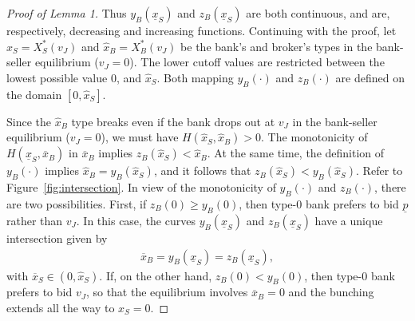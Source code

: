 \documentclass[11pt,twopage]{article}
\newcommand{\ol}{\overline}
\newcommand{\ul}{\underline}
\begin{document}
\begin{proof}[Proof of Lemma 1]
Thus $y_B(\ul x_S)$ and $z_B(\ul x_S)$ are both continuous, and are,
respectively, decreasing and increasing functions. Continuing with the
proof, let $\hat x_S = X_S^*(v_J)$ and $\hat x_B = X_B^*(v_J)$ be the
bank's and broker's types in the bank-seller equilibrium ($v_J =
0$). The lower cutoff values are restricted between the lowest
possible value $0$, and $\hat x_S$. Both mapping $y_B(\cdot)$ and
$z_B(\cdot)$ are defined on the domain $[0,\hat x_S ]$.



Since the $\hat x_B$ type breaks even if the bank drops out at $v_J$
in the bank-seller equilibrium ($v_J = 0$), we must have $H(\hat
x_S,\hat x_B)>0$. The monotonicity of $H(\underline x_S,\ol x_B)$ in
$\ol x_B$ implies $z_B(\hat x_S)<\hat x_B$. At the same time, the
definition of $y_B(\cdot)$ implies $\hat x_B = y_B(\hat x_S)$, and it
follows that $z_B(\hat x_S)<y_B(\hat x_S)$.  Refer to
Figure~\ref{fig:intersection}. In view of the monotonicity of
$y_B(\cdot)$ and $z_B(\cdot)$, there are two possibilities. First, if
$z_B(0) \geq y_B(0)$, then type-$0$ bank prefers to bid $\ul p$ rather
than $v_J$. In this case, the curves $y_B(\ul x_S)$ and $z_B(\ul x_S)$
have a unique intersection given by
\begin{align}
  \ol x_B = y_B(\underline x_S)=z_B(\underline
  x_S), \label{eq:intersection}
\end{align}
with $\ol x_S \in (0,\hat x_S)$. If, on the other hand, $z_B(0) <
y_B(0)$, then type-$0$ bank prefers to bid $v_J$, so that the
equilibrium involves $\ol x_B = 0$ and the bunching extends all the
way to $x_S = 0$.
%


\end{proof}
\end{document}
